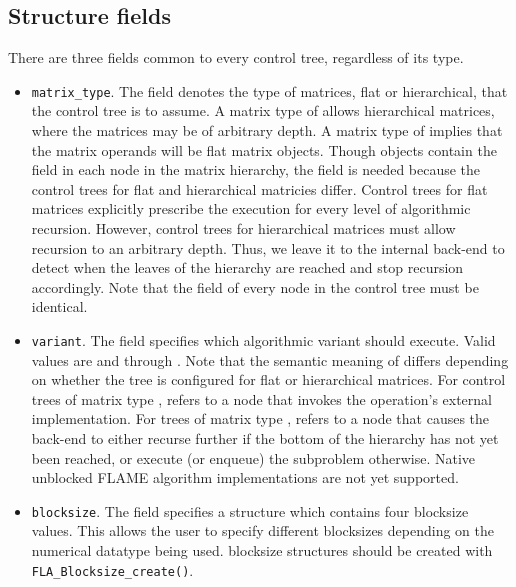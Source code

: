 \subsection{Structure fields}

There are three fields common to every control tree, regardless of its type.



\begin{itemize}
\item
{\tt matrix\_type}.
The \matrixtype field denotes the type of matrices, flat or
hierarchical, that the control tree is to assume.
A matrix type of \flahier allows hierarchical matrices, where the
matrices may be of arbitrary depth.
A matrix type of \flaflat implies that the matrix operands will be flat
matrix objects.
Though \libflame objects contain the \elemtype field in each node in the
matrix hierarchy, the \matrixtype field is needed because the control trees
for flat and hierarchical matricies differ.
Control trees for flat matrices explicitly prescribe the execution for every
level of algorithmic recursion.
However, control trees for hierarchical matrices must allow recursion to
an arbitrary depth.
Thus, we leave it to the internal back-end to detect when the leaves of the
hierarchy are reached and stop recursion accordingly.
Note that the \matrixtype field of every node in the control tree must be
identical.
\item
{\tt variant}.
The \variant field specifies which algorithmic variant should execute.
Valid values are \flasubproblem and \flablockedvariantone
through \flablockedvarianttwentyns.
Note that the semantic meaning of \flasubproblem differs depending on whether
the tree is configured for flat or hierarchical matrices.
For control trees of matrix type \flaflat, \flasubproblem refers to a node
that invokes the operation's external implementation.
For trees of matrix type \flahier, \flasubproblem refers to a node that
causes the back-end to either recurse further if the bottom of the hierarchy
has not yet been reached, or execute (or enqueue) the subproblem otherwise.
Native unblocked FLAME algorithm implementations are not yet supported.
\item
{\tt blocksize}.
The \blocksize field specifies a structure which contains four blocksize
values.
This allows the user to specify different blocksizes depending on the
numerical datatype being used.
blocksize structures should be created with {\tt FLA\_Blocksize\_create()}.
\end{itemize}

